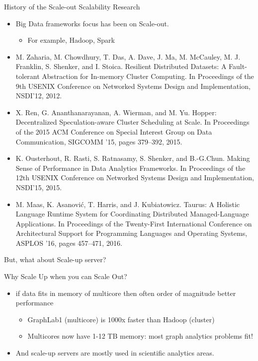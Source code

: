 \documentclass[english]{beamer} %
\begin{document}
\begin{frame}{History of the Scale-out Scalability Research}
    \begin{itemize}
    \item Big Data frameworks focus has been on Scale-out.
        \begin{itemize}
            \item For example, Hadoop, Spark 
        \end{itemize}
    \item \tiny{M. Zaharia, M. Chowdhury, T. Das, A. Dave, J. Ma, M. McCauley,
    M. J.
    Franklin, S. Shenker, and I. Stoica.
    Resilient Distributed Datasets: A Fault-tolerant Abstraction for In-memory
    Cluster Computing. In Proceedings of the 9th USENIX Conference on Networked
    Systems Design and Implementation, NSDI’12, 2012.}
    \item X. Ren, G. Ananthanarayanan, A. Wierman, and M. Yu. Hopper:
     Decentralized Speculation-aware Cluster Scheduling at Scale. In Proceedings
    of the 2015 ACM Conference on Special Interest Group on Data Communication,
    SIGCOMM ’15, pages 379–392, 2015.
    \item K. Ousterhout, R. Rasti, S. Ratnasamy, S. Shenker, and B.-G.Chun.
    Making Sense of Performance in Data Analytics Frameworks. In Proceedings of the
    12th USENIX Conference on Networked Systems Design and Implementation,
    NSDI’15, 2015.
    \item M. Maas, K. Asanović, T. Harris, and J. Kubiatowicz. Taurus: A
    Holistic Language Runtime System for Coordinating Distributed Managed-Language
    Applications. In Proceedings of the Twenty-First International Conference on
    Architectural Support for Programming Languages and Operating Systems,
    ASPLOS ’16, pages 457–471, 2016.
    \end{itemize}
\end{frame}

\begin{frame}{But, what about Scale-up server?}
\end{frame}

\begin{frame}{Why Scale Up when you can Scale Out?}
    \begin{itemize}
    \item if data fits in memory of multicore then often order of magnitude
    better performance
        \begin{itemize}
            \item GraphLab1 (multicore) is 1000x faster than Hadoop (cluster)
            \item Multicores now have 1-12 TB memory: most graph analytics
            problems fit!
        \end{itemize}
    \item And scale-up servers are mostly used in scientific analytics areas.
    \end{itemize}
\end{frame}
\end{document}
